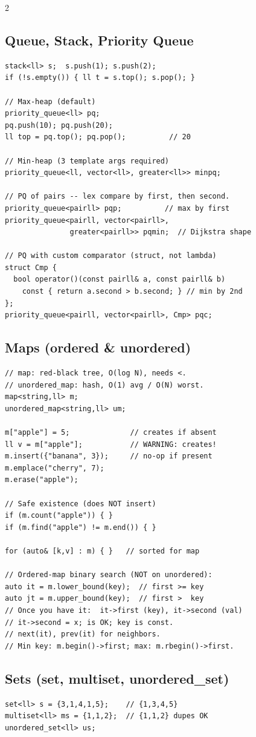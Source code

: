 \documentclass[10pt,letterpaper]{extarticle}
\newenvironment{block}[1]
  {\subsection*{#1}\nopagebreak}
  {\par\addvspace{2pt}}
\begin{document}
\begin{multicols*}{2}
\begin{block}{Queue, Stack, Priority Queue}
\begin{lstlisting}
stack<ll> s;  s.push(1); s.push(2);
if (!s.empty()) { ll t = s.top(); s.pop(); }

// Max-heap (default)
priority_queue<ll> pq;
pq.push(10); pq.push(20);
ll top = pq.top(); pq.pop();          // 20

// Min-heap (3 template args required)
priority_queue<ll, vector<ll>, greater<ll>> minpq;

// PQ of pairs -- lex compare by first, then second.
priority_queue<pairll> pqp;          // max by first
priority_queue<pairll, vector<pairll>,
               greater<pairll>> pqmin;  // Dijkstra shape

// PQ with custom comparator (struct, not lambda)
struct Cmp {
  bool operator()(const pairll& a, const pairll& b)
    const { return a.second > b.second; } // min by 2nd
};
priority_queue<pairll, vector<pairll>, Cmp> pqc;
\end{lstlisting}
\end{block}

\begin{block}{Maps (ordered \& unordered)}
\begin{lstlisting}
// map: red-black tree, O(log N), needs <.
// unordered_map: hash, O(1) avg / O(N) worst.
map<string,ll> m;
unordered_map<string,ll> um;

m["apple"] = 5;              // creates if absent
ll v = m["apple"];           // WARNING: creates!
m.insert({"banana", 3});     // no-op if present
m.emplace("cherry", 7);
m.erase("apple");

// Safe existence (does NOT insert)
if (m.count("apple")) { }
if (m.find("apple") != m.end()) { }

for (auto& [k,v] : m) { }   // sorted for map

// Ordered-map binary search (NOT on unordered):
auto it = m.lower_bound(key);  // first >= key
auto jt = m.upper_bound(key);  // first >  key
// Once you have it:  it->first (key), it->second (val)
// it->second = x; is OK; key is const.
// next(it), prev(it) for neighbors.
// Min key: m.begin()->first; max: m.rbegin()->first.
\end{lstlisting}
\end{block}

\begin{block}{Sets (set, multiset, unordered\_set)}
\begin{lstlisting}
set<ll> s = {3,1,4,1,5};    // {1,3,4,5}
multiset<ll> ms = {1,1,2};  // {1,1,2} dupes OK
unordered_set<ll> us;


\end{lstlisting}
\end{block}
\end{multicols*}
\end{document}
